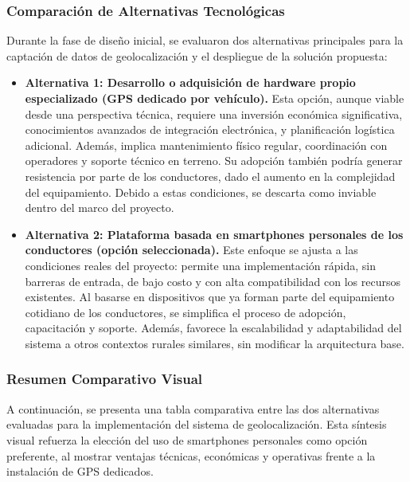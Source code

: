 \documentclass[12pt]{article}
\begin{document}
\subsubsection{Comparación de Alternativas Tecnológicas}
Durante la fase de diseño inicial, se evaluaron dos alternativas principales para la captación de datos de geolocalización y el despliegue de la solución propuesta:
\begin{itemize}
    \item  \textbf{Alternativa 1: Desarrollo o adquisición de hardware propio especializado (GPS dedicado por vehículo).} Esta opción, aunque viable desde una perspectiva técnica, requiere una inversión económica significativa, conocimientos avanzados de integración electrónica, y planificación logística adicional. Además, implica mantenimiento físico regular, coordinación con operadores y soporte técnico en terreno. Su adopción también podría generar resistencia por parte de los conductores, dado el aumento en la complejidad del equipamiento. Debido a estas condiciones, se descarta como inviable dentro del marco del proyecto. 

    \item \textbf{Alternativa 2: Plataforma basada en smartphones personales de los conductores (opción seleccionada).} Este enfoque se ajusta a las condiciones reales del proyecto: permite una implementación rápida, sin barreras de entrada, de bajo costo y con alta compatibilidad con los recursos existentes. Al basarse en dispositivos que ya forman parte del equipamiento cotidiano de los conductores, se simplifica el proceso de adopción, capacitación y soporte. Además, favorece la escalabilidad y adaptabilidad del sistema a otros contextos rurales similares, sin modificar la arquitectura base.
\end{itemize}

\vspace{0.5cm}
\newpage
\subsubsection*{Resumen Comparativo Visual}

A continuación, se presenta una tabla comparativa entre las dos alternativas evaluadas para la implementación del sistema de geolocalización. Esta síntesis visual refuerza la elección del uso de smartphones personales como opción preferente, al mostrar ventajas técnicas, económicas y operativas frente a la instalación de GPS dedicados.
\end{document}
